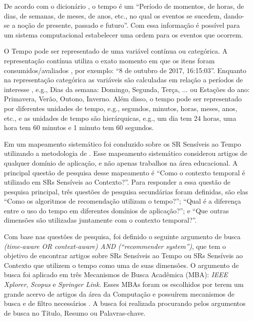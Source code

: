 De acordo com o dicionário , o tempo é um  ``Período de momentos, de horas, de dias,
de semanas, de meses, de anos, etc., no qual os eventos se sucedem, dando-se a noção de presente, passado e futuro''.
Com essa informação é possível para um sistema computacional estabelecer uma ordem para os eventos que ocorrem.

O Tempo pode ser representado de uma variável contínua ou categórica. A representação contínua utiliza o exato momento
em que os itens foram consumidos/avaliados \cite{campos2014time}, por exemplo: ``8 de outubro de 2017, 16:15:03''.
Enquanto na representação categórica as variáveis são calculadas em relação a períodos de interesse \cite{campos2014time},
e.g., Dias da semana: {Domingo, Segunda, Terça, ...} ou Estações do ano: {Primavera, Verão, Outono, Inverno}. Além
disso, o tempo pode ser representado por diferentes unidades de tempo, e.g., segundos, minutos, horas, meses, anos,
etc., e as unidades de tempo são hierárquicas, e.g., um dia tem 24 horas, uma hora tem 60 minutos e 1 minuto tem 60
segundos.

Em  um mapeamento sistemático foi conduzido sobre os SR Sensíveis ao Tempo utilizando a metodologia de
. Esse mapeamento sistemático considerou artigos de qualquer domínio de aplicação,
e não apenas trabalhos na área educacional. A principal questão de pesquisa desse mapeamento é ``Como o contexto
temporal é utilizado em SRs Sensíveis ao Contexto?''. Para responder a essa questão de pesquisa principal, três questões
de pesquisa secundárias foram definidas, são elas ``Como os algoritmos de recomendação utilizam o tempo?''; ``Qual é a
diferença entre o uso do tempo em diferentes domínios de aplicação?''; e ``Que outras dimensões são utilizadas
juntamente com o contexto temporal?''.

Com base nas questões de pesquisa, foi definido o seguinte argumento de busca
\textit{(time-aware OR context-aware) AND (``recommender system'')}, que tem o objetivo de encontrar artigos sobre
SRs Sensíveis ao Tempo ou SRs Sensíveis ao Contexto que utilizem o tempo como uma de suas dimensões.
O argumento de busca foi aplicado em três Mecanismos de Busca Acadêmica (MBA): \textit{IEEE Xplorer}, \textit{Scopus} e
\textit{Springer Link}. Esses MBAs foram os escolhidos por terem um grande acervo
de artigos da área da Computação e possuírem mecanismos de busca e de filtro necessários \cite{de2017time}. A busca
foi realizada procurando pelos argumentos de busca no Título, Resumo ou Palavras-chave.

